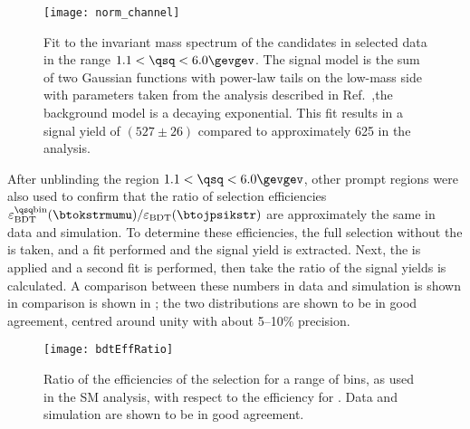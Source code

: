 \begin{figure}
  \begin{center}
    \texttt{[image: norm\_channel]}
    \caption[Fit to the normalisation channel, \btokstrmumu for $1.1<\qsq<6.0\gevgev$]
    {
      Fit to the invariant mass spectrum of the \Bd candidates in selected data in the range
      $1.1<\qsq<6.0\gevgev$.
      The signal model is the sum of two Gaussian functions with power-law tails on the low-mass
      side with parameters taken from the analysis described in
      Ref.~\protect\cite{LHCb-CONF-2015-002},the background model is a decaying exponential.
      This fit results in a signal yield of $(527\pm26)$ compared to approximately 625 in the \sm
      analysis.
    }
    \label{fig:db:norm}
  \end{center}
\end{figure}

After unblinding the region $1.1<\qsq<6.0\gevgev$, other prompt \qsq regions were also used to
confirm that the ratio of \bdt selection efficiencies
$\varepsilon_\mathrm{BDT}^\mathrm{\qsq bin}(\btokstrmumu) / \varepsilon_\mathrm{BDT}(\btojpsikstr)$
are approximately the same in data and simulation.
To determine these efficiencies, the full selection without the \BDT is taken, and a fit performed
and the signal yield is extracted.
Next, the \BDT is applied and a second fit is performed, then take the ratio of the signal
yields is calculated.
A comparison between these numbers in data and simulation is shown in comparison is shown in
; the two distributions are shown to be in good agreement, centred around
unity with about 5--10\% precision.

\begin{figure}
  \begin{center}
    \texttt{[image: bdtEffRatio]}
    \caption[Efficiency ratios]
    {
      Ratio of the efficiencies of the \bdt selection for a range of \qsq bins, as used in the SM
      \btokstrmumu analysis, with respect to the efficiency for \decay{\Bd}{\jpsi\Kstarz}.
      Data and simulation are shown to be in good agreement.
    }
    \label{fig:bdtEffRatio}
  \end{center}
\end{figure}

